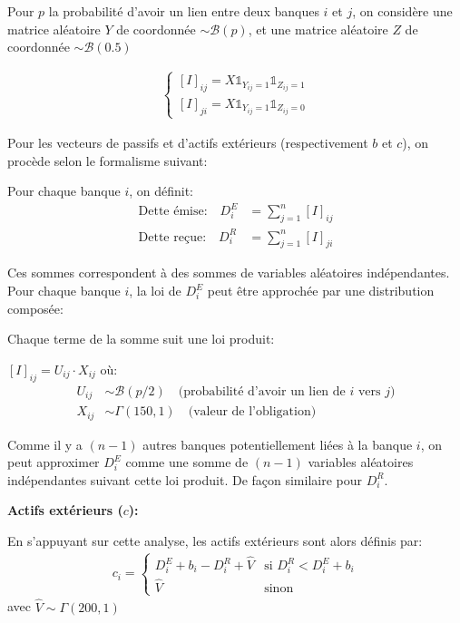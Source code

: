 \vspace{0.45cm}
Pour $p$ la probabilité d'avoir un lien entre deux banques $i$ et $j$, on considère une matrice aléatoire $Y$ de coordonnée $\sim \mathcal{B}(p)$,
et une matrice aléatoire $Z$ de coordonnée $\sim \mathcal{B}(0.5)$

\begin{align*}
    \begin{cases}
        [I]_{ij} = X\mathds{1}_{Y_{ij} = 1}\mathds{1}_{Z_{ij} = 1}\\
        [I]_{ji} = X\mathds{1}_{Y_{ij} = 1}\mathds{1}_{Z_{ij} = 0}
    \end{cases}
\end{align*}

\vspace{0.45cm}
Pour les vecteurs de passifs et d'actifs extérieurs (respectivement $b$ et $c$), on procède selon le formalisme suivant:

Pour chaque banque $i$, on définit:
\begin{align*}
    \text{Dette émise:} \quad D^E_i &= \sum_{j=1}^{n} [I]_{ij} \\
    \text{Dette reçue:} \quad D^R_i &= \sum_{j=1}^{n} [I]_{ji}
\end{align*}

Ces sommes correspondent à des sommes de variables aléatoires indépendantes.
Pour chaque banque $i$, la loi de $D^E_i$ peut être approchée par une distribution composée:

Chaque terme de la somme suit une loi produit:

$[I]_{ij} = U_{ij} \cdot X_{ij}$ où:
\begin{align*}
    U_{ij} &\sim \mathcal{B}(p/2) \quad \text{(probabilité d'avoir un lien de $i$ vers $j$)} \\
    X_{ij} &\sim \Gamma(150, 1) \quad \text{(valeur de l'obligation)}
\end{align*}

Comme il y a $(n-1)$ autres banques potentiellement liées à la banque $i$,
on peut approximer $D^E_i$ comme une somme de $(n-1)$ variables aléatoires indépendantes suivant cette loi produit.
De façon similaire pour $D^R_i$.

\textbf{Actifs extérieurs ($c$):}

En s'appuyant sur cette analyse, les actifs extérieurs sont alors définis par:
\begin{align*}
    c_i =
    \begin{cases}
        D^E_i + b_i - D^R_i + \hat{V} & \text{si } D^R_i < D^E_i + b_i \\
        \hat{V} & \text{sinon}
    \end{cases}
\end{align*}
avec $\hat{V} \sim \Gamma(200, 1)$


